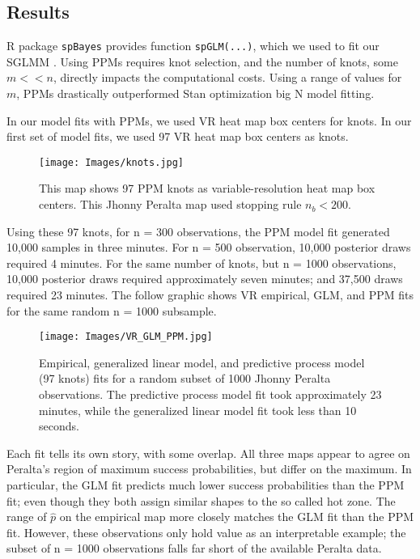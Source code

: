 \subsection{Results}

R package \verb|spBayes| provides function \verb|spGLM(...)|, which we used to fit our SGLMM \citep{Finley2013}. Using PPMs requires knot selection, and the number of knots, some $m < < n$, directly impacts the computational costs. Using a range of values for $m$, PPMs drastically outperformed Stan optimization big N model fitting. 

In our model fits with PPMs, we used VR heat map box centers for knots. In our first set of model fits, we used 97 VR heat map box centers as knots. 
  \begin{figure}[H]
	\centering 
	\texttt{[image: Images/knots.jpg]}
	\caption{This map shows 97 PPM knots as variable-resolution heat map box centers. This Jhonny Peralta map used stopping rule $n_{b} < 200$.}
	\end{figure}
Using these 97 knots, for n = 300 observations, the PPM model fit generated 10,000 samples in three minutes. For n = 500 observation, 10,000 posterior draws required 4 minutes. For the same number of knots, but n = 1000 observations, 10,000 posterior draws required approximately seven minutes; and 37,500 draws required 23 minutes. The follow graphic shows VR empirical, GLM, and PPM fits for the same random n = 1000 subsample.
  \begin{figure}[H]
	\centering 
	\texttt{[image: Images/VR\_GLM\_PPM.jpg]}
	\caption{Empirical, generalized linear model, and predictive process model (97 knots) fits for a random subset of 1000 Jhonny Peralta observations. The predictive process model fit took approximately 23 minutes, while the generalized linear model fit took less than 10 seconds.}
	\label{fig:comps1}
	\end{figure}
Each fit tells its own story, with some overlap. All three maps appear to agree on Peralta's region of maximum success probabilities, but differ on the maximum. In particular, the GLM fit predicts much lower success probabilities than the PPM fit; even though they both assign similar shapes to the so called hot zone. The range of $\hat{p}$ on the empirical map more closely matches the GLM fit than the PPM fit. However, these observations only hold value as an interpretable example; the subset of n = 1000 observations falls far short of the available Peralta data.


